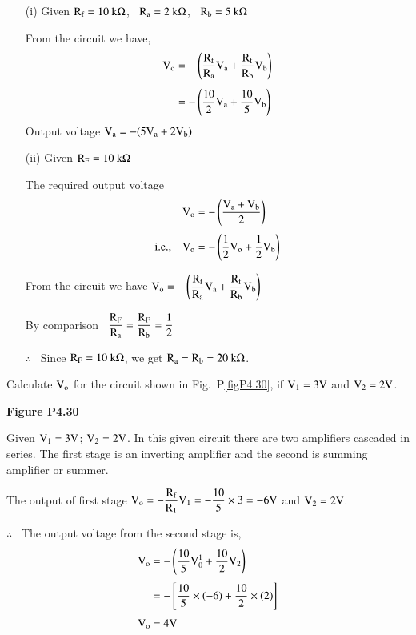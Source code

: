 \begin{solution}
\begin{itemize}
\item[(i)] Given $\textrm{R}_{\textrm{f}}=10~\textrm{k}\Omega$, \ $\textrm{R}_{\textrm{a}}=2~\textrm{k}\Omega$, \ $\textrm{R}_{\textrm{b}}=5~\textrm{k}\Omega$

From the circuit we have,
\begin{align*}
\textrm{V}_{\textrm{o}} &= -\left(\frac{\textrm{R}_{\textrm{f}}}{\textrm{R}_{\textrm{a}}}\textrm{V}_{\textrm{a}}+\frac{\textrm{R}_{\textrm{f}}}{\textrm{R}_{\textrm{b}}}\textrm{V}_{\textrm{b}}\right)\\[4pt]
&= -\left(\frac{10}{2}\textrm{V}_{\textrm{a}}+\frac{10}{5}\textrm{V}_{\textrm{b}}\right)
\end{align*}
Output voltage $\textrm{V}_{\textrm{a}}=-(5\textrm{V}_{\textrm{a}}+2\textrm{V}_{\textrm{b}})$

\item[(ii)] Given $\textrm{R}_{\textrm{F}}=10~\textrm{k}\Omega$

\smallskip
The required output voltage 
\begin{align*}
\textrm{V}_{\textrm{o}} &=-\left(\dfrac{\textrm{V}_{\textrm{a}}+\textrm{V}_{\textrm{b}}}{2}\right)\\[3pt]
\text{i.e.,}\quad \textrm{V}_{\textrm{o}} &=-\left(\frac{1}{2}\textrm{V}_{\textrm{o}}+\frac{1}{2}\textrm{V}_{\textrm{b}}\right)
\end{align*}

From the circuit we have $\textrm{V}_{\textrm{o}}=-\left(\dfrac{\textrm{R}_{\textrm{f}}}{\textrm{R}_{\textrm{a}}}\textrm{V}_{\textrm{a}}+\dfrac{\textrm{R}_{\textrm{f}}}{\textrm{R}_{\textrm{b}}}\textrm{V}_{\textrm{b}}\right)$

\medskip
By comparison \ $\dfrac{\textrm{R}_{\textrm{F}}}{\textrm{R}_{\textrm{a}}}=\dfrac{\textrm{R}_{\textrm{F}}}{\textrm{R}_{\textrm{b}}}=\dfrac{1}{2}$

\medskip
$\therefore$~ Since $\textrm{R}_{\textrm{F}}=10~\textrm{k}\Omega$, we get $\textrm{R}_{\textrm{a}}=\textrm{R}_{\textrm{b}}=20~\textrm{k}\Omega$.
\end{itemize}
\end{solution}

\begin{problem}\label{prob4.30}
Calculate $\textrm{V}_{\textrm{o}}$ for the circuit shown in Fig.~P\ref{figP4.30}, if $\textrm{V}_{1}=3\textrm{V}$ and $\textrm{V}_{2}=2\textrm{V}$.
\begin{center}
{\bf Figure P4.30}
\end{center}
\end{problem}

\begin{solution}
Given $\textrm{V}_{1}=3\textrm{V}$; $\textrm{V}_{2}=2\textrm{V}$. In this given circuit there are two amplifiers cascaded in series. The first stage is an inverting amplifier and the second is summing amplifier or summer.

\smallskip
The output of first stage $\textrm{V}_{\textrm{o}}=-\dfrac{\textrm{R}_{\textrm{f}}}{\textrm{R}_{1}}\textrm{V}_{1}=-\dfrac{10}{5}\times 3=-6\textrm{V}$ and $\textrm{V}_{2}=2\textrm{V}$.

\smallskip
$\therefore$~ The output voltage from the second stage is,
\begin{align*}
\textrm{V}_{\textrm{o}} &= -\left(\dfrac{10}{5}\textrm{V}^{1}_{0}+\dfrac{10}{2}\textrm{V}_{2}\right)\\[3pt]
&=-\left[\frac{10}{5}\times (-6)+\dfrac{10}{2}\times (2)\right]\\[3pt]
\textrm{V}_{\textrm{o}} &= 4\textrm{V}
\end{align*}
\end{solution}

